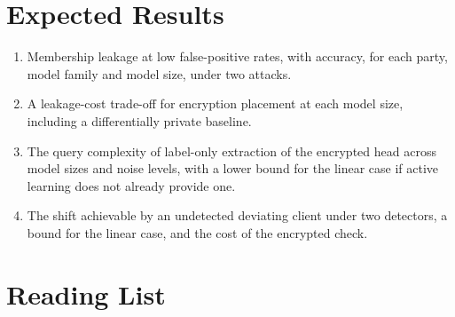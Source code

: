 \documentclass[10pt,a4paper]{article}
\begin{document}
\section{Expected Results}

\begin{enumerate}
\item Membership leakage at low false-positive rates, with accuracy, for each party, model family and model size, under two attacks.
\item A leakage-cost trade-off for encryption placement at each model size, including a differentially private baseline.
\item The query complexity of label-only extraction of the encrypted head across model sizes and noise levels, with a lower bound for the linear case if active learning does not already provide one.
\item The shift achievable by an undetected deviating client under two detectors, a bound for the linear case, and the cost of the encrypted check.
\end{enumerate}

\section{Reading List}
\end{document}
